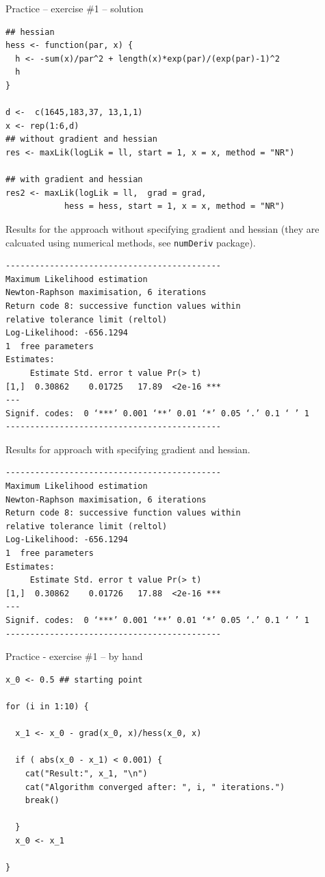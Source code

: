 \documentclass[10pt,ignorenonframetext,aspectratio=169]{beamer}
\begin{document}
\begin{frame}{Practice -- exercise \#1 -- solution}
\begin{verbatim}
## hessian
hess <- function(par, x) {
  h <- -sum(x)/par^2 + length(x)*exp(par)/(exp(par)-1)^2 
  h
}

d <-  c(1645,183,37, 13,1,1)
x <- rep(1:6,d)
## without gradient and hessian
res <- maxLik(logLik = ll, start = 1, x = x, method = "NR")

## with gradient and hessian
res2 <- maxLik(logLik = ll,  grad = grad, 
            hess = hess, start = 1, x = x, method = "NR")
\end{verbatim}

\newpage

Results for the approach without specifying gradient and hessian (they are calcuated using numerical methods, see \texttt{numDeriv} package).
\begin{verbatim}
--------------------------------------------
Maximum Likelihood estimation
Newton-Raphson maximisation, 6 iterations
Return code 8: successive function values within 
relative tolerance limit (reltol)
Log-Likelihood: -656.1294
1  free parameters
Estimates:
     Estimate Std. error t value Pr(> t)
[1,]  0.30862    0.01725   17.89  <2e-16 ***
---
Signif. codes:  0 ‘***’ 0.001 ‘**’ 0.01 ‘*’ 0.05 ‘.’ 0.1 ‘ ’ 1
--------------------------------------------
\end{verbatim}

\newpage

Results for approach with specifying gradient and hessian.
\begin{verbatim}
--------------------------------------------
Maximum Likelihood estimation
Newton-Raphson maximisation, 6 iterations
Return code 8: successive function values within 
relative tolerance limit (reltol)
Log-Likelihood: -656.1294
1  free parameters
Estimates:
     Estimate Std. error t value Pr(> t)
[1,]  0.30862    0.01726   17.88  <2e-16 ***
---
Signif. codes:  0 ‘***’ 0.001 ‘**’ 0.01 ‘*’ 0.05 ‘.’ 0.1 ‘ ’ 1
--------------------------------------------
\end{verbatim}
\end{frame}



\begin{frame}[fragile]{Practice - exercise \#1 -- by hand}
    \begin{verbatim}
x_0 <- 0.5 ## starting point

for (i in 1:10) { 
  
  x_1 <- x_0 - grad(x_0, x)/hess(x_0, x)
  
  if ( abs(x_0 - x_1) < 0.001) {
    cat("Result:", x_1, "\n")
    cat("Algorithm converged after: ", i, " iterations.")
    break()
    
  }
  x_0 <- x_1

}
\end{verbatim}
\end{frame}
\end{document}
